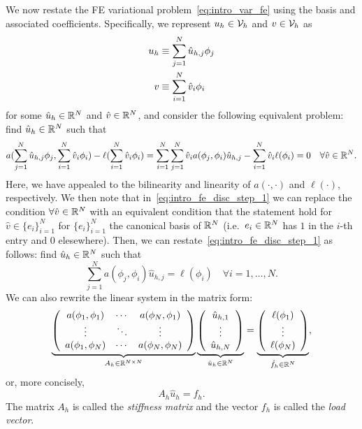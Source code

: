 We now restate the FE variational problem~\eqref{eq:intro_var_fe} using the basis and associated coefficients.  Specifically, we represent $u_h \in \calV_h$ and $v \in \calV_h$ as 
\begin{align}
  u_h &\equiv \sum_{j=1}^N \hat u_{h,j} \phi_j \label{eq:intro_uh_rep} \\
   v &\equiv \sum_{i=1}^N \hat v_i \phi_i \notag
\end{align}
for some $\hat u_h \in \RR^N$ and $\hat v \in \RR^N$, and consider the following equivalent problem: find $\hat u_h \in \RR^N$ such that
\begin{equation}
  a(\sum_{j=1}^N \hat u_{h,j} \phi_j, \sum_{i=1}^N \hat v_i \phi_i) - \ell(\sum_{i=1}^N \hat v_i \phi_i)
  =
  \sum_{i=1}^N \sum_{j=1}^N \hat v_i a(\phi_j, \phi_i) \hat u_{h,j} -
  \sum_{i=1}^N \hat v_i \ell(\phi_i) = 0 \quad \forall \hat v \in \RR^N.
  \label{eq:intro_fe_disc_step_1}
\end{equation}
Here, we have appealed to the bilinearity and linearity of $a(\cdot,\cdot)$ and $\ell(\cdot)$, respectively. We then note that in~\eqref{eq:intro_fe_disc_step_1} we can replace the condition $\forall \hat v \in \RR^N$ with an equivalent condition that the statement hold for $\hat v \in \{e_i \}_{i=1}^N$ for $\{e_i\}_{i=1}^N$ the canonical basis of $\RR^N$ (i.e.~$e_i \in \RR^N$ has $1$ in the $i$-th entry and $0$ elesewhere). Then, we can restate~\eqref{eq:intro_fe_disc_step_1} as follows: find $\hat u_h \in \RR^N$ such that
\begin{equation}
  \sum_{j=1}^N a(\phi_j,\phi_i) \hat u_{h,j} = \ell(\phi_i) \quad  \forall i = 1,\dots,N.
  \label{eq:intro_sys}
\end{equation}
We can also rewrite the linear system in the matrix form:
\begin{equation*}
  \underbrace{ \bmat{ccc}
  a(\phi_1,\phi_1) & \cdots & a(\phi_N,\phi_1) \\
  \vdots & \ddots & \vdots \\
  a(\phi_1,\phi_N) & \cdots & a(\phi_N,\phi_N) \\
  \emat
  }_{A_h \in \RR^{N \times N}}
  \underbrace{ \bmat{c} \hat u_{h,1}  \\ \vdots \\ \hat u_{h,N} \emat }_{\hat u_h \in \RR^N}
  =
  \underbrace{ \bmat{c} \ell(\phi_1) \\ \vdots \\ \ell(\phi_N) \emat }_{\hat f_h \in \RR^N},
\end{equation*}
or, more concisely,
\begin{equation*}
  A_h \hat u_h = f_h.
\end{equation*}
The matrix $A_h$ is called the \emph{stiffness matrix} and the vector $f_h$ is called the \emph{load vector}.%

